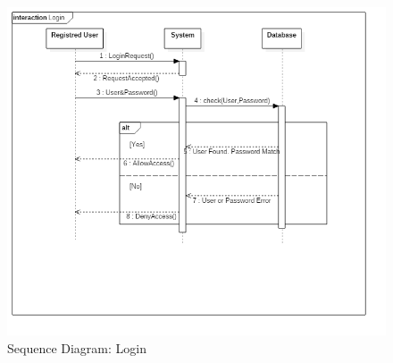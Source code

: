 \begin{figure}[H]
	\centering
	\includegraphics[width=6in]{./diagrams/SequenceLogin.png}
	\caption{Sequence Diagram: Login}
	\label{fig:SequenceLogin}
\end{figure}